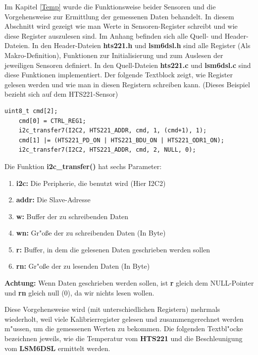 \vspace{10cm}
Im Kapitel \ref{Temp} wurde die Funktionsweise beider Sensoren und die 
Vorgehensweise zur Ermittlung der gemessenen Daten behandelt. In diesem 
Abschnitt wird gezeigt wie man Werte in Sensoren-Register schreibt und
wie diese Register auszulesen sind. Im Anhang befinden sich alle Quell- 
und Header-Dateien. In den Header-Dateien \textbf{hts221.h} und 
\textbf{lsm6dsl.h} sind alle Register (Als Makro-Definition), 
Funktionen zur Initialisierung und zum Auslesen der jeweiligen Sensoren 
definiert. In den Quell-Dateien \textbf{hts221.c} und 
\textbf{lsm6dsl.c} sind diese Funktionen implementiert. Der folgende 
Textblock zeigt, wie Register gelesen werden und wie man in diesen 
Registern schreiben kann. (Dieses Beispiel bezieht sich auf dem 
HTS221-Sensor)

\begin{lstlisting}[frame=single]
	uint8_t cmd[2];
	cmd[0] = CTRL_REG1;
	i2c_transfer7(I2C2, HTS221_ADDR, cmd, 1, (cmd+1), 1);
	cmd[1] |= (HTS221_PD_ON | HTS221_BDU_ON | HTS221_ODR1_ON);
	i2c_transfer7(I2C2, HTS221_ADDR, cmd, 2, NULL, 0);

\end{lstlisting}
Die Funktion \textbf{i2c\_transfer()} hat sechs Parameter:

\begin{enumerate}
	\item \textbf{i2c:} Die Peripherie, die benutzt wird (Hier I2C2) 
	\item \textbf{addr:} Die Slave-Adresse  
	\item \textbf{w:} Buffer der zu schreibenden Daten
	\item \textbf{wn:} Gr"o\ss{}e der zu schreibenden Daten (In Byte)
	\item \textbf{r:} Buffer, in dem die gelesenen Daten geschrieben 
	werden sollen
	\item \textbf{rn:} Gr"o\ss{}e der zu lesenden Daten (In Byte)
\end{enumerate}

\textbf{Achtung:} Wenn Daten geschrieben werden sollen, ist \textbf{r} 
gleich dem NULL-Pointer und \textbf{rn} gleich null (0), da wir nichts 
lesen wollen.

Diese Vorgehensweise wird (mit unterschiedlichen Registern) mehrmals 
wiederholt, weil viele Kalibrierregister gelesen und zusammengerechnet 
werden m"ussen, um die gemessenen Werten zu bekommen. Die folgenden 
Textbl"ocke bezeichnen jeweils, wie die Temperatur vom \textbf{HTS221} 
und die Beschleunigung vom \textbf{LSM6DSL} ermittelt werden.

